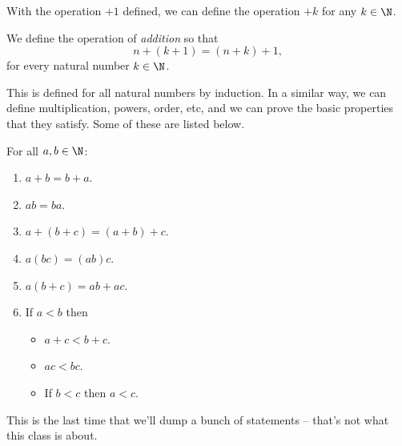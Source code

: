 \documentclass[a4]{scrartcl}
\begin{document}
With the operation $+1$ defined, we can define the operation $+k$ for any $k \in \N$.

\begin{definition}[Addition]
	We define the operation of \emph{addition} so that
	$$
	n + (k + 1) = (n + k) + 1,
	$$
	for every natural number $k \in \N$.
\end{definition}

This is defined for all natural numbers by induction.
In a similar way, we can define multiplication, powers, order, etc, and we can prove the basic properties that they satisfy. Some of these are listed below.

\begin{proposition}
	For all $a, b \in \N$:
	\begin{enumerate}[label=(\roman*)]
		\item $a + b = b + a$.
		\item $ab = ba$.
		\item $a + (b + c) = (a + b) + c$.
		\item $a(bc) = (ab)c$.
		\item $a(b + c) = ab + ac$.
		\item If $a < b$ then
		\begin{itemize}
			\item $a + c < b + c$.
			\item $ac < bc$.
			\item If $b < c$ then $a < c$.
		\end{itemize}
	\end{enumerate}
\end{proposition}

\begin{remark}
	This is the last time that we'll dump a bunch of statements -- that's not what this class is about.
\end{remark}




\end{document}
